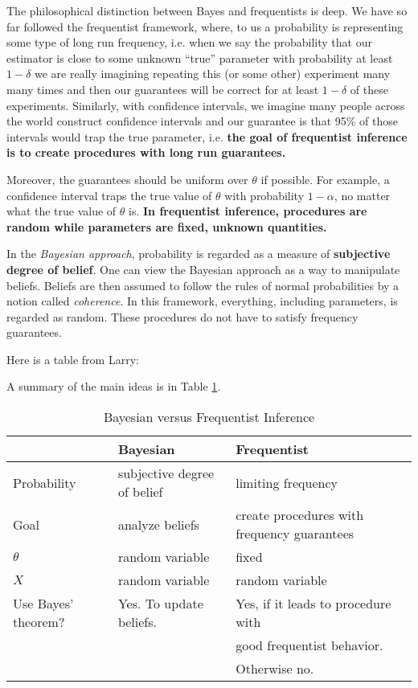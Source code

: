 \documentclass[twoside,12pt]{article}
\begin{document}
The philosophical distinction between Bayes and frequentists is deep. We have so far followed the frequentist framework, where, to us a probability is representing some type of 
long run frequency, i.e. when we say the probability that our estimator is close to some unknown ``true'' parameter with probability at least $1 - \delta$ we are really imagining repeating this (or some other) experiment many many times and then our guarantees will be correct for at least $1 - \delta$ of these experiments. Similarly, with confidence intervals, we imagine many people across the world construct confidence intervals and our guarantee is that 95\% of those intervals would trap the true parameter, i.e.
{\bf the goal of frequentist inference is to
create procedures with
long run guarantees.}

Moreover, the guarantees should be
uniform over $\theta$ if possible.
For example, a confidence interval traps the true
value of $\theta$ with probability $1-\alpha$,
no matter what the true value of $\theta$ is.
{\bf In frequentist inference,
procedures are random while parameters are fixed, unknown quantities.}

In the {\em Bayesian approach},
probability is regarded as a measure of {\bf subjective degree of belief}. One can view the Bayesian approach as a way to manipulate beliefs. Beliefs are then assumed to follow the rules of normal probabilities by a notion called \emph{coherence}. 
In this framework, everything, including parameters, is regarded as random.
These procedures do not have to satisfy frequency guarantees.

Here is a table from Larry:

A summary of the main ideas is in Table \ref{table::ideas}.


\begin{table}[h]
\begin{tabular}{l|ll}
            & Bayesian                     & Frequentist\\ \hline
Probability & subjective degree of belief  & limiting frequency \\
Goal        & analyze beliefs              & create procedures with frequency guarantees\\
$\theta$    & random variable              & fixed\\
$X$         & random variable              & random variable\\
Use Bayes' theorem? & Yes. To update beliefs. & Yes, if it leads to procedure with\\
                    &                         & good frequentist behavior.\\
                    &                         & Otherwise no.\\ \hline
\end{tabular}
\caption{Bayesian versus Frequentist Inference}
\label{table::ideas}
\end{table}
\end{document}
